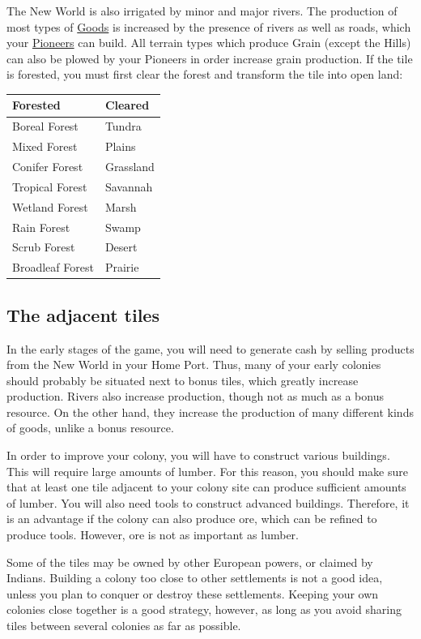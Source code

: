 \documentclass[12pt]{book}
\begin{document}
The New World is also irrigated by minor and major rivers. The
production of most types of \hyperlink{Goods}{Goods} is increased by
the presence of rivers as well as roads, which your
\hyperlink{Pioneer}{Pioneers} can build. All terrain types which
produce Grain (except the Hills) can also be plowed by your Pioneers
in order increase grain production. If the tile is forested, you must
first clear the forest and transform the tile into open land:

\vskip5mm
\begin{tabular}{l @{\hskip5mm$\rightarrow$\hskip5mm} l}
Forested&Cleared\\
\hline
Boreal Forest & Tundra\\
Mixed Forest & Plains\\
Conifer Forest & Grassland\\
Tropical Forest & Savannah\\
Wetland Forest & Marsh\\
Rain Forest & Swamp\\
Scrub Forest & Desert\\
Broadleaf Forest & Prairie\\
\end{tabular}
\vskip5mm


\hypertarget{The adjacent tiles}{\subsection{The adjacent tiles}}

In the early stages of the game, you will need to generate cash by
selling products from the New World in your Home Port. Thus, many of
your early colonies should probably be situated next to bonus tiles,
which greatly increase production. Rivers also increase production,
though not as much as a bonus resource. On the other hand, they
increase the production of many different kinds of goods, unlike a
bonus resource.

In order to improve your colony, you will have to construct various
buildings. This will require large amounts of lumber. For this reason,
you should make sure that at least one tile adjacent to your colony
site can produce sufficient amounts of lumber. You will also need
tools to construct advanced buildings. Therefore, it is an advantage
if the colony can also produce ore, which can be refined to produce
tools. However, ore is not as important as lumber.

Some of the tiles may be owned by other European powers, or claimed by
Indians. Building a colony too close to other settlements is not a
good idea, unless you plan to conquer or destroy these settlements.
Keeping your own colonies close together is a good strategy, however,
as long as you avoid sharing tiles between several colonies as far as
possible.
\end{document}
